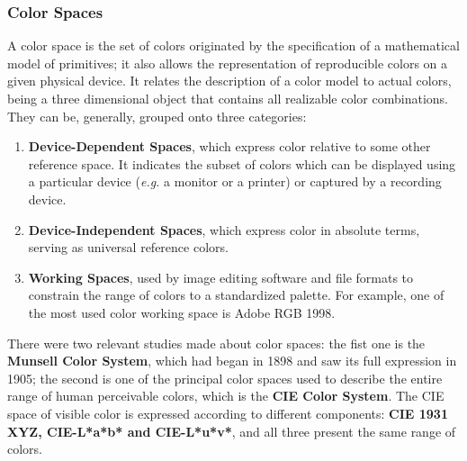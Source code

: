 \documentclass{report}
\begin{document}
\subsubsection{Color Spaces}
A color space is the set of colors originated by the specification of a mathematical model of primitives; it also 
allows the representation of reproducible colors on a given physical device. It relates the description
of a color model to actual colors, being a three dimensional object that contains all realizable color
combinations. They can be, generally, grouped onto three categories: 
	\begin{enumerate}
	\item \textbf{Device-Dependent Spaces}, which express color relative to some other reference space. It
    indicates the subset of colors which can be displayed using a particular device (\emph{e.g.} a monitor or a
    printer) or captured by a recording device.
	\item \textbf{Device-Independent Spaces}, which express color in absolute terms, serving as universal
    reference colors.
	\item \textbf{Working Spaces}, used by image editing software and file formats to constrain the range of
    colors to a standardized palette. For example, one of the most used color working space is Adobe RGB 1998. 
	\end{enumerate} \par
There were two relevant studies made about color spaces: the fist one is the \textbf{Munsell Color System},
which had began in 1898 and saw its full expression in 1905; the second is one of the principal color spaces used to describe the
entire range of human perceivable colors, which is the \textbf{CIE Color System}. The CIE space of visible color is expressed
according to different components: \textbf{CIE 1931 XYZ, CIE-L*a*b* and CIE-L*u*v*}, and all three present the same range of colors.
%
\end{document}
